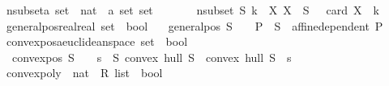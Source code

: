 \begin{isabellebody}
\ nsubset{\isacharcolon}{\kern0pt}{\isacharcolon}{\kern0pt}{\isachardoublequoteopen}{\isacharprime}{\kern0pt}a\ set\ {\isasymRightarrow}\ nat\ {\isasymRightarrow}\ {\isacharparenleft}{\kern0pt}{\isacharprime}{\kern0pt}a\ set{\isacharparenright}{\kern0pt}\ set{\isachardoublequoteclose}\ {\isacharparenleft}{\kern0pt}\ {\isachardoublequoteopen}{\isachartilde}{\kern0pt}{\isachardoublequoteclose}\ {}{}{\isacharparenright}{\kern0pt}\ \ \isanewline
\ \ {\isachardoublequoteopen}nsubset\ S\ k\ {\isacharequal}{\kern0pt}\ {\isacharbraceleft}{\kern0pt}X{\isachardot}{\kern0pt}\ X\ {\isasymsubseteq}\ S\ {\isasymand}\ \ card\ X\ {\isacharequal}{\kern0pt}\ k{\isacharbraceright}{\kern0pt}{\isachardoublequoteclose}\isanewline
\isanewline
\isanewline
{}\isamarkupfalse%
\ general{\isacharunderscore}{\kern0pt}pos{\isacharcolon}{\kern0pt}{\isacharcolon}{\kern0pt}{\isachardoublequoteopen}{\isacharparenleft}{\kern0pt}{\isacharparenleft}{\kern0pt}real{\isasymtimes}real{\isacharparenright}{\kern0pt}\ set{\isacharparenright}{\kern0pt}\ {\isasymRightarrow}\ bool{\isachardoublequoteclose}\ \isanewline
\ \ {\isachardoublequoteopen}general{\isacharunderscore}{\kern0pt}pos\ S\ {\isasymequiv}\ \ {\isacharparenleft}{\kern0pt}{\isasymforall}\ P{}\ {\isasymin}\ S{\isachartilde}{\kern0pt}{}{\isachardot}{\kern0pt}\ {\isasymnot}\ affine{\isacharunderscore}{\kern0pt}dependent\ P{}{\isacharparenright}{\kern0pt}{\isachardoublequoteclose}\isanewline
\isanewline
\isanewline
\isanewline
{}\isamarkupfalse%
\ convex{\isacharunderscore}{\kern0pt}pos{\isacharcolon}{\kern0pt}{\isacharcolon}{\kern0pt}{\isachardoublequoteopen}{\isacharparenleft}{\kern0pt}{\isacharprime}{\kern0pt}a{\isacharcolon}{\kern0pt}{\isacharcolon}{\kern0pt}euclidean{\isacharunderscore}{\kern0pt}space\ set{\isacharparenright}{\kern0pt}\ {\isasymRightarrow}\ bool{\isachardoublequoteclose}\ \isanewline
\ \ {\isachardoublequoteopen}convex{\isacharunderscore}{\kern0pt}pos\ S\ {\isasymequiv}\ \ {\isacharparenleft}{\kern0pt}{\isasymforall}\ s\ {\isasymin}\ S{\isachardot}{\kern0pt}\ convex\ hull\ S\ {\isasymnoteq}\ convex\ hull\ {\isacharparenleft}{\kern0pt}S\ {\isacharminus}{\kern0pt}\ {\isacharbraceleft}{\kern0pt}s{\isacharbraceright}{\kern0pt}{\isacharparenright}{\kern0pt}{\isacharparenright}{\kern0pt}{\isachardoublequoteclose}\isanewline
\isanewline
{}\isamarkupfalse%
\ convex{\isacharunderscore}{\kern0pt}poly\ {\isacharcolon}{\kern0pt}{\isacharcolon}{\kern0pt}\ {\isachardoublequoteopen}nat\ {\isasymRightarrow}\ R{}\ list\ {\isasymRightarrow}\ bool{\isachardoublequoteclose}\ \isanewline

\end{isabellebody}
